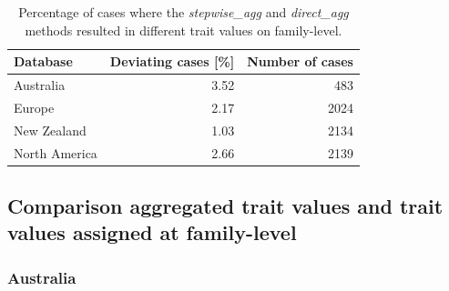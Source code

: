 \documentclass{article}
\begin{document}
\begin{table}[ht]
      \centering
      \caption{Percentage of cases where the \textit{stepwise\_agg} and \textit{direct\_agg} methods 
      resulted in different trait values on family-level.}
      \label{tab:diff_trait_agg_methods}
      \begin{tabular}{lrr}
        \hline
      Database & Deviating cases [\%] & Number of cases \\ 
        \hline
      Australia & 3.52 & 483 \\ 
        Europe & 2.17 & 2024 \\ 
        New Zealand & 1.03 & 2134 \\ 
        North America & 2.66 & 2139 \\ 
        \hline
\end{tabular}
\end{table}

\subsection{Comparison aggregated trait values and trait values assigned at family-level}

\subsubsection{Australia}
\end{document}
